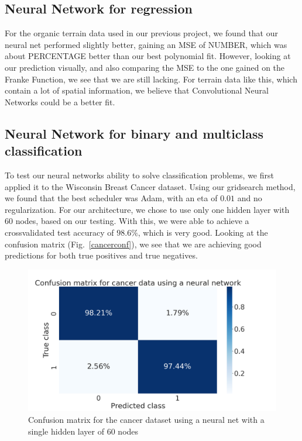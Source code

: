 \documentclass[onecolumn,10pt,cleanfoot]{asme2ej}
\begin{document}
\subsection{Neural Network for regression}

For the organic terrain data used in our previous project, we found that our neural net performed slightly better, gaining an MSE of NUMBER, which was about PERCENTAGE better than our best polynomial fit. However, looking at our prediction visually, and also comparing the MSE to the one gained on the Franke Function, we see that we are still lacking. For terrain data like this, which contain a lot of spatial information, we believe that Convolutional Neural Networks could be a better fit.

\subsection{Neural Network for binary and multiclass classification}

To test our neural networks ability to solve classification problems, we first applied it to the Wisconsin Breast Cancer dataset. Using our gridsearch method, we found that the best scheduler was Adam, with an eta of $0.01$ and no regularization. For our architecture, we chose to use only one hidden layer with 60 nodes, based on our testing. With this, we were able to achieve a crossvalidated test accuracy of $98.6 \%$, which is very good. Looking at the confusion matrix (Fig.~\ref{cancerconf}), we see that we are achieving good predictions for both true positives and true negatives.

\begin{figure}[h]
\centerline{\includegraphics[width=5in]{figure/cancerconf.png}}
\caption{Confusion matrix for the cancer dataset using a neural net with a single hidden layer of 60 nodes}
\label{verification}
\end{figure}
\end{document}
